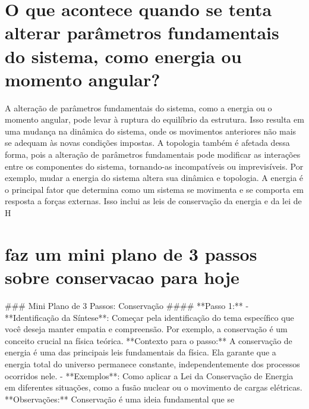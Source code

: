 \documentclass[11pt,a4paper]{article}
\begin{document}
\section{O que acontece quando se tenta alterar parâmetros fundamentais do sistema, como energia ou momento angular?}
A alteração de parâmetros fundamentais do sistema, como a energia ou o momento angular, pode levar à ruptura do equilíbrio da estrutura. Isso resulta em uma mudança na dinâmica do sistema, onde os movimentos anteriores não mais se adequam às novas condições impostas. A topologia também é afetada dessa forma, pois a alteração de parâmetros fundamentais pode modificar as interações entre os componentes do sistema, tornando-as incompatíveis ou imprevisíveis. Por exemplo, mudar a energia do sistema altera sua dinâmica e topologia. A energia é o principal fator que determina como um sistema se movimenta e se comporta em resposta a forças externas. Isso inclui as leis de conservação da energia e da lei de H

\section{faz um mini plano de 3 passos sobre conservacao para hoje}
\#\#\# Mini Plano de 3 Passos: Conservação \#\#\#\# **Passo 1:** - **Identificação da Síntese**: Começar pela identificação do tema específico que você deseja manter empatia e compreensão. Por exemplo, a conservação é um conceito crucial na física teórica. **Contexto para o passo:** A conservação de energia é uma das principais leis fundamentais da física. Ela garante que a energia total do universo permanece constante, independentemente dos processos ocorridos nele. - **Exemplos**: Como aplicar a Lei da Conservação de Energia em diferentes situações, como a fusão nuclear ou o movimento de cargas elétricas. **Observações:** Conservação é uma ideia fundamental que se
\end{document}
